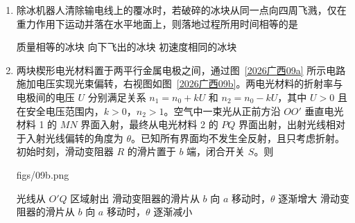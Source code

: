 \documentclass[\gkver]{gaokaozhenti}
\begin{document}
\begin{enumerate}
{D．$t_{1} \sim t_{2}$ 时间内，金属棒 $OP$ 的角速度为 0，产生的感应电动势为 0，电感 $L$ 会产生自感电动势，自感电流与原电流方向相同，$LED_{1}$ 与电感 $L$ 串联，$LED_{2}$ 与电阻 $R$ 串联，自感电流无法反向通过 $LED_{2}$，$\frac{2\pi}{\omega_{0}} \sim t_{2}$ 时间，$LED_{1}$ 比 $LED_{2}$ 后熄灭，故 D 错误。

故选 B。
}
\item
除冰机器人清除输电线上的覆冰时，若破碎的冰块从同一点向四周飞溅，仅在重力作用下运动并落在水平地面上，则落地过程所用时间相等的是 

{质量相等的冰块}
{向下飞出的冰块}
{初速度相同的冰块}


\item
两块楔形电光材料置于两平行金属电极之间，通过图~\ref{2026广西09a} 所示电路施加电压实现光束偏转，右视图如图~\ref{2026广西09b}。两电光材料的折射率与电极间的电压 $U$ 分别满足关系 $n_{1} = n_{0} + kU$ 和 $n_{2} = n_{0} - kU$，其中 $U > 0$ 且在安全电压范围内，$k > 0$，$n_{2} > 1$。空气中一束光从正前方沿 $OO'$ 垂直电光材料 1 的 $MN$ 界面入射，最终从电光材料 2 的 $PQ$ 界面出射，出射光线相对于入射光线偏转的角度为 $\theta$。已知所有界面均不发生全反射，且只考虑折射。初始时刻，滑动变阻器 $R$ 的滑片置于 $b$ 端，闭合开关 $S$。则 

{figs/09b.png}

{光线从 $O'Q$ 区域射出}
{滑动变阻器的滑片从 $b$ 向 $a$ 移动时，$\theta$ 逐渐增大}
{滑动变阻器的滑片从 $b$ 向 $a$ 移动时，$\theta$ 逐渐减小}



\end{enumerate}
\end{document}

